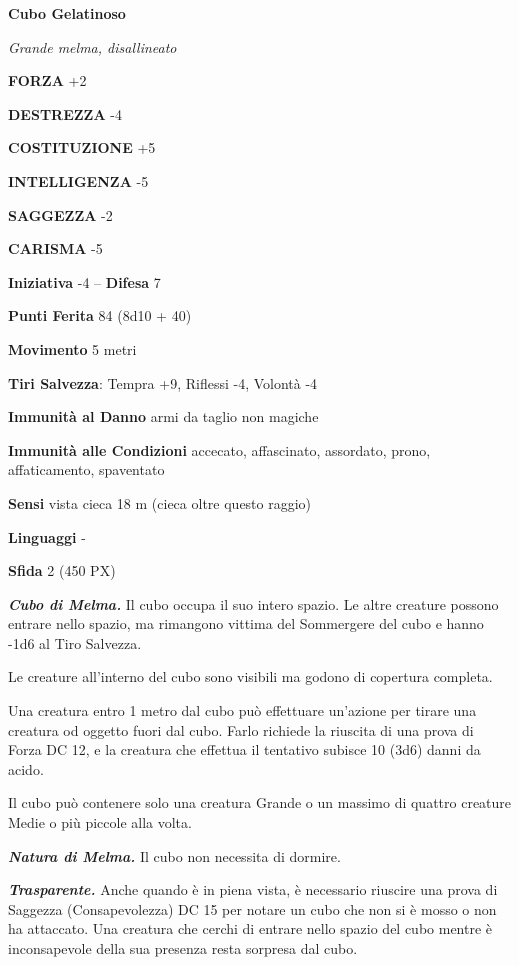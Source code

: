 \begin{multicols}{2}
	\medskip{}\textbf{Cubo Gelatinoso}

	\textit{Grande melma, disallineato}

	\textbf{FORZA} +2

	\textbf{DESTREZZA} -4

	\textbf{COSTITUZIONE} +5

	\textbf{INTELLIGENZA} -5

	\textbf{SAGGEZZA} -2

	\textbf{CARISMA} -5

	\textbf{Iniziativa} -4 -- \textbf{Difesa} 7

	\textbf{Punti Ferita} 84 (8d10 + 40)

	\textbf{Movimento} 5 metri

	\textbf{Tiri Salvezza}: Tempra +9, Riflessi -4, Volontà -4

	\textbf{Immunità al Danno} armi da taglio non magiche

	\textbf{Immunità alle Condizioni} accecato, affascinato, assordato, prono, affaticamento, spaventato

	\textbf{Sensi} vista cieca 18 m (cieca oltre questo raggio)

	\textbf{Linguaggi} -

	\textbf{Sfida} 2 (450 PX)

	\textit{\textbf{Cubo di Melma.}} Il cubo occupa il suo intero spazio. Le altre creature possono entrare nello spazio, ma rimangono vittima del Sommergere del cubo e hanno -1d6 al Tiro Salvezza.

	Le creature all'interno del cubo sono visibili ma godono di copertura completa.

	Una creatura entro 1 metro dal cubo può effettuare un'azione per tirare una creatura od oggetto fuori dal cubo. Farlo richiede la riuscita di una prova di Forza DC 12, e la creatura che effettua il tentativo subisce 10 (3d6) danni da acido.

	Il cubo può contenere solo una creatura Grande o un massimo di quattro creature Medie o più piccole alla volta.

	\textit{\textbf{Natura di Melma.}} Il cubo non necessita di dormire.

	\textit{\textbf{Trasparente.}} Anche quando è in piena vista, è necessario riuscire una prova di Saggezza (Consapevolezza) DC 15 per notare un cubo che non si è mosso o non ha attaccato. Una creatura che cerchi di entrare nello spazio del cubo mentre è inconsapevole della sua presenza resta sorpresa dal cubo.


\end{multicols}
